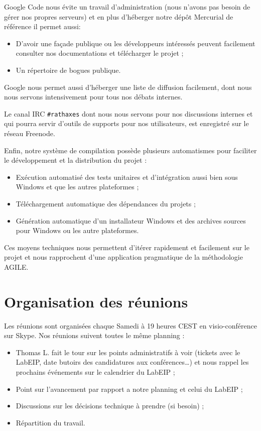 \documentclass[francais]{rtxreport}
\begin{document}
Google Code nous évite un travail d'administration (nous n'avons pas besoin de
gérer nos propres serveurs) et en plus d'héberger notre dépôt Mercurial de
référence il permet aussi:
\begin{itemize}
\item D'avoir une façade publique ou les développeurs intéressés peuvent
  facilement consulter nos documentations et télécharger le projet ;
\item Un répertoire de bogues publique.
\end{itemize}
Google nous permet aussi d'héberger une liste de diffusion facilement, dont nous
nous servons intensivement pour tous nos débats internes.

Le canal IRC \texttt{\#rathaxes} dont nous nous servons pour nos discussions
internes et qui pourra servir d'outils de supports pour nos utilisateurs, est
enregistré sur le réseau Freenode.

Enfin, notre système de compilation possède plusieurs automatismes pour
faciliter le développement et la distribution du projet :
\begin{itemize}
\item Exécution automatisé des tests unitaires et d'intégration aussi bien sous
  Windows et que les autres plateformes ;
\item Téléchargement automatique des dépendances du projets ;
\item Génération automatique d'un installateur Windows et des archives sources
  pour Windows ou les autre plateformes.
\end{itemize}

Ces moyens techniques nous permettent d'itérer rapidement et facilement sur le
projet et nous rapprochent d'une application pragmatique de la méthodologie
AGILE.

\section{Organisation des réunions}

Les réunions sont organisées chaque Samedi à 19 heures CEST en visio-conférence
sur Skype. Nos réunions suivent toutes le même planning :
\begin{itemize}
\item Thomas L. fait le tour sur les points administratifs à voir (tickets avec
  le LabEIP, date butoirs des candidatures aux conférences\ldots) et nous rappel
  les prochains événements sur le calendrier du LabEIP ;
\item Point sur l'avancement par rapport a notre planning et celui du LabEIP ;
\item Discussions sur les décisions technique à prendre (si besoin) ;
\item Répartition du travail.
\end{itemize}
\end{document}
